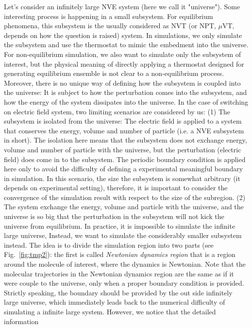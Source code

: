 \documentclass[aip,jcp,a4paper,preprint,onecolumn]{revtex4-1}
\begin{document}
Let's consider an infinitely large NVE system (here we call it
"universe"). Some interesting process is happening in a small
subsystem. For equilibrium phenomena, this subsystem is the usually
considered as NVT (or NPT, $\mu$VT, depends on how the question is
raised) system.  In simulations, we only simulate the subsystem and
use the thermostat to mimic the embedment into the universe.  For
non-equilibrium simulation, we also want to simulate only the
subsystem of interest, but the physical meaning of directly applying a
thermostat designed for generating equilibrium ensemble is not clear
to a non-equilibrium process. Moreover, there is no unique way of
defining how the subsystem is coupled into the universe: It is subject
to how the perturbation comes into the subsystem, and how the energy
of the system dissipates into the universe. In the case of switching on
electric field system, two limiting scenarios are considered by us: (1)
The subsystem is isolated from the universe: The electric field is
applied to a system that conserves the energy, volume and number of
particle (i.e. a NVE subsystem in short).  The isolation here means
that the subsystem does not exchange energy, volume and number of
particle with the universe, but the perturbation (electric field) does
come in to the subsystem.  The periodic boundary condition is applied
here only to avoid the difficulty of defining a experimental
meaningful boundary in simulation.  In this scenario, the size the
subsystem is somewhat arbitrary (it depends on experimental setting),
therefore, it is important to consider the convergence of the
simulation result with respect to the size of the subregion.  (2) The
system exchange the energy, volume and particle with the universe, and
the universe is so big that the perturbation in the subsystem will not
kick the universe from equilibrium.  In practice, it is impossible to
simulate the infinite large universe, Instead, we want to simulate the
considerably smaller subsystem instead.  The idea is to divide the
simulation region into two parts (see Fig.~\ref{fig:tmp2}): the first
is called \emph{Newtonian dynamics region} that is a region around the
molecule of interest, where the dynamics is Newtonian. Note that the
molecular trajectories in the Newtonian dynamics region are the same
as if it were couple to the universe, only when a proper boundary
condition is provided. Strictly speaking, the boundary should be
provided by the out side infinitely large universe, which immediately
leads back to the numerical difficulty of simulating a infinite large
system. However, we notice that the detailed information
\end{document}
